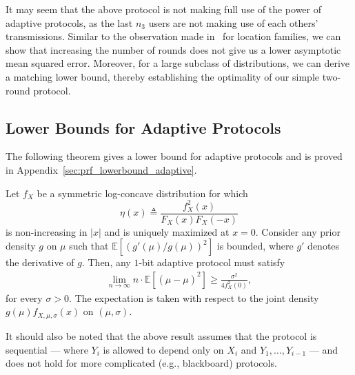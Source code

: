 \documentclass[10pt]{article} %
\theoremstyle{plain}
\theoremstyle{definition}
\theoremstyle{remark}
\newcommand{\bE}{\mathbb E}
\begin{document}
\begin{remark}
 It may seem that the above protocol is not making full use of the power of adaptive protocols, as the last $n_3$ users are not making use of each others' transmissions.
 Similar to the observation made in~\citep{kipnis2022mean} for location families, we can show that increasing the number of rounds does not give us a lower asymptotic mean squared error. 
 Moreover, for a large subclass of distributions, we can derive a matching lower bound, thereby establishing the optimality of our simple two-round protocol. 
\end{remark}

\subsection{Lower Bounds for Adaptive Protocols }\label{sec:lower_bounds}

 The following theorem gives a lower bound for adaptive protocols and is proved in Appendix~\ref{sec:prf_lowerbound_adaptive}.

\begin{theorem}\label{thm:lowerbound_adaptive}
    Let $f_X$ be a symmetric log-concave distribution for which 
    \begin{equation}\label{eq:eta_condn}
    \eta(x)\triangleq \frac{f_X^2(x)}{F_X(x)F_X(-x)}
    \end{equation}
    is non-increasing in $|x|$ and is uniquely maximized at $x=0$.
    Consider any prior density $g$ on $\mu$ such that $\bE \left[\left(g'(\mu)/g(\mu)\right)^2\right]$ is bounded, where $g'$ denotes the derivative of $g$.
    Then,  any $1$-bit adaptive protocol must satisfy
    \begin{align}
    \lim_{n\to\infty}n \cdot \bE[(\hat{\mu}-\mu)^2]\geq \frac{\sigma^2} {4f_X^2(0)}, \label{eq:thm_result_adaptive}
    \end{align}
    for every $\sigma>0$.
    The expectation is taken with respect to the joint density $g(\mu)f_{X,\mu,\sigma}(x)$ on $(\mu,\sigma)$.
\end{theorem}


 It should also be noted that the above result assumes that the protocol is sequential --- where $Y_i$ is allowed to depend only on $X_i$ and $Y_1,\ldots,Y_{i-1}$ --- and does not hold for more complicated (e.g., blackboard) protocols.
\end{document}
